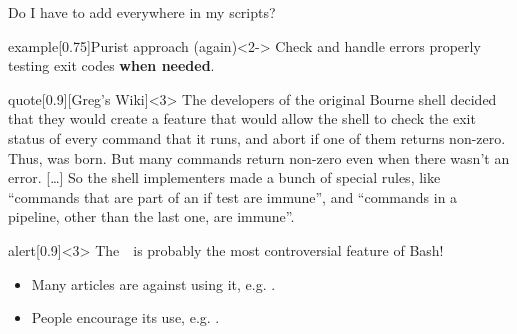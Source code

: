 \begin{frame}{Do I have to add \;\; everywhere in my scripts?}
    \vspace{-3mm}
    \begin{varblock}{example}[0.75\textwidth]{Purist approach (again)}<2->
        Check and handle errors properly testing exit codes \textbf{when needed}.
    \end{varblock}
    \begin{varblock}{quote}[0.9\textwidth]{}[Greg's Wiki]<3>
        The developers of the original Bourne shell decided that they would create a feature that would allow the shell to check the exit status of every command that it runs, and abort if one of them returns non-zero.
        Thus,  was born.
        But many commands return non-zero even when there wasn't an error.
        [\ldots]
        So the shell implementers made a bunch of special rules, like ``commands that are part of an if test are immune'', and ``commands in a pipeline, other than the last one, are immune''.
    \end{varblock}
    \begin{varblock}{alert}[0.9\textwidth]{}<3>
        \alert{The \,\, is probably the most controversial feature of Bash!}
    \end{varblock}
    \begin{itemize}[<3>]
        \item Many articles are against using it, e.g. .
        \item People encourage its use, e.g. .
    \end{itemize}
\end{frame}
